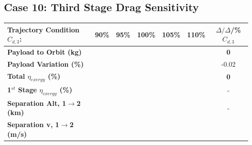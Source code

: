 \subsection{Case 10: Third Stage Drag Sensitivity}
\begin{table}[ht] %
	\centering
	\begin{tabular}{l c c c c c c} 
		\hline \textbf{Trajectory Condition}   \qquad  $C_{d,3}$:
		&90\%
		&95\%
		&100\%
		&105\%
		&110\%
		& $\Delta/\Delta$/\%$C_{d,3}$
			\\
			\hline \textbf{Payload to Orbit (kg)}
			& \textbf{\PayloadToOrbitCdThreeNinetyNoReturn}
			& \textbf{\PayloadToOrbitCdThreeNinetyFiveNoReturn}
			& \textbf{\PayloadToOrbitCdThreeStandardNoReturn}
			& \textbf{\PayloadToOrbitCdThreeOneOneHundredFiveNoReturn}
			& \textbf{\PayloadToOrbitCdThreeOneHundredTenNoReturn}
			&\textbf{0}
			\\
			\textbf{Payload Variation (\%)}
			& \PayloadVarCdThreeNinetyNoReturn
			& \PayloadVarCdThreeNinetyFiveNoReturn
			& \PayloadVarCdThreeStandardNoReturn
			& \PayloadVarCdThreeOneOneHundredFiveNoReturn
			& \PayloadVarCdThreeOneHundredTenNoReturn
			&-0.02
			\\
			\textbf{Total $\eta_{exergy}$ (\%)}
			& \textbf{\totalExergyEffCdThreeNinetyNoReturn}
			& \textbf{\totalExergyEffCdThreeNinetyFiveNoReturn}
			& \textbf{\totalExergyEffCdThreeStandardNoReturn}
			& \textbf{\totalExergyEffCdThreeOneOneHundredFiveNoReturn}
			& \textbf{\totalExergyEffCdThreeOneHundredTenNoReturn}
			& \textbf{0}
			\\
			\hline 
			\textbf{1$^{st}$ Stage $\eta_{exergy}$ (\%)}
			& \textbf{\firstExergyEffCdThreeNinetyNoReturn}
			& \textbf{\firstExergyEffCdThreeNinetyFiveNoReturn}
			& \textbf{\firstExergyEffCdThreeStandardNoReturn}
			& \textbf{\firstExergyEffCdThreeOneOneHundredFiveNoReturn}
			& \textbf{\firstExergyEffCdThreeOneHundredTenNoReturn}
			& -
			\\
			\textbf{Separation Alt, 1$\rightarrow$2 (km)}
			& \firstsecondSeparationAltCdThreeNinetyNoReturn
			& \firstsecondSeparationAltCdThreeNinetyFiveNoReturn
			& \firstsecondSeparationAltCdThreeStandardNoReturn
			& \firstsecondSeparationAltCdThreeOneOneHundredFiveNoReturn
			& \firstsecondSeparationAltCdThreeOneHundredTenNoReturn
			& -
			\\
			\textbf{Separation v, 1$\rightarrow$2 (m/s)}
			& \firstsecondSeparationvCdThreeNinetyNoReturn
			& \firstsecondSeparationvCdThreeNinetyFiveNoReturn
			& \firstsecondSeparationvCdThreeStandardNoReturn

\end{tabular}
\end{table}
